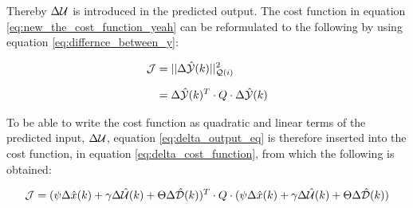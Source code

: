 Thereby $\Delta \CMcal{U}$ is introduced in the predicted output. The cost function in equation \ref{eq:new_the_cost_function_yeah} can be reformulated to the following by using equation \ref{eq:differnce_between_y}:

\begin{equation}\begin{aligned}\label{eq:delta_cost_function}
	\CMcal{J} &= ||\Delta\hat{\CMcal{Y}}(k)||_{\CMcal{Q}(i)}^2\\[6pt]
	  &= \Delta\hat{\CMcal{Y}}(k)^T \cdot Q \cdot \Delta\hat{\CMcal{Y}}(k)
	\end{aligned}
\end{equation}

To be able to write the cost function as quadratic and linear terms of the predicted input, $\Delta\CMcal{U}$, equation \ref{eq:delta_output_eq} is therefore inserted into the cost function, in equation \ref{eq:delta_cost_function}, from which the following is obtained:

\begin{equation}\label{eq:cost_function_with_all_the_crap}
	\CMcal{J} = (\psi\Delta \hat{x}(k) + \gamma\Delta \hat{\CMcal{U}}(k) + \Theta\Delta \hat{\CMcal{D}}(k))^T\cdot Q \cdot (\psi\Delta \hat{x}(k) + \gamma\Delta \hat{\CMcal{U}}(k) + \Theta\Delta \hat{\CMcal{D}}(k))
\end{equation}



